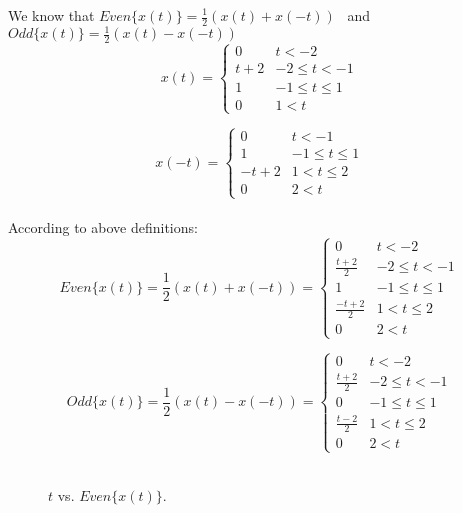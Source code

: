 \documentclass[10pt,a4paper, margin=1in]{article}
\begin{document}
\begin{enumerate}
\begin{enumerate}
    We know that $Even \{x(t)\} = \frac{1}{2}(x(t) + x(-t))$  \ and \ $Odd \{x(t)\} = \frac{1}{2}(x(t) - x(-t))$ \\
  \[x(t) = \begin{cases} 
      0 & t < -2 \\
      t+2 & -2\leq t < -1 \\
      1 & -1 \leq t \leq 1 \\
      0 & 1<t 
   \end{cases}
\]

\[x(-t) = \begin{cases}
	  0 & t < -1 \\ 
	  1 & -1\leq t \leq 1 \\
	  -t+2 & 1 < t \leq 2 \\
	  0 & 2<t  
   \end{cases}
\]
\\
According to above definitions: \\
\[Even \{x(t)\} = \frac{1}{2}(x(t) + x(-t)) =  \begin{cases}
	  0 & t<-2  \\
	  \frac{t+2}{2} & -2 \leq t < -1 \\
	  1 & -1\leq t \leq 1 \\
      \frac{-t+2}{2} & 1 < t \leq 2 \\
      0 & 2 < t 
   \end{cases}
\]

\[Odd \{x(t)\} = \frac{1}{2}(x(t) - x(-t)) =  \begin{cases}
	  0 & t<-2  \\
	  \frac{t+2}{2} & -2 \leq t < -1 \\
	  0 & -1\leq t \leq 1 \\
      \frac{t-2}{2} & 1 < t \leq 2 \\
      0 & 2 < t 
   \end{cases}
\]
\\

\begin{figure}[h!]
    \centering
        \caption{$t$ vs. $Even\{x(t)\}$.}
        \label{fig:q6_1}
    \end{figure}
    

\end{enumerate}
\end{enumerate}
\end{document}
